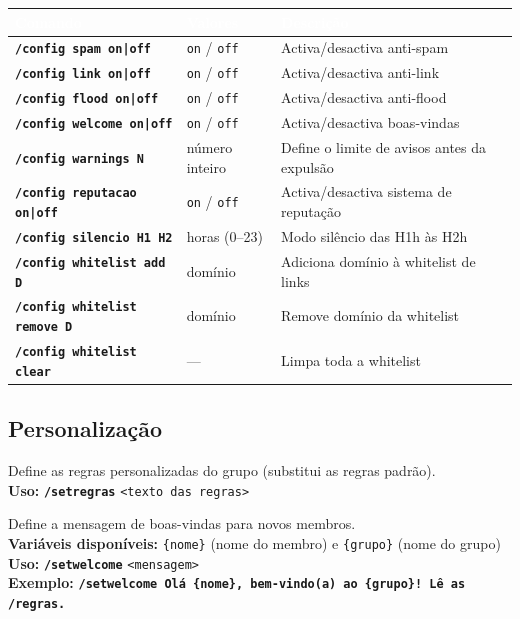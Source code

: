 \documentclass[12pt,a4paper]{article}
\newcommand{\cmd}[1]{\texttt{\textcolor{orbisblue}{\textbf{#1}}}}
\newcommand{\param}[1]{\texttt{\textcolor{orbisMid}{#1}}}
\begin{document}
\begin{center}
\begin{longtable}{L{4.5cm} L{4cm} L{5cm}}
\toprule
{}\textcolor{white}{\textbf{Comando}} & \textcolor{white}{\textbf{Valores}} & \textcolor{white}{\textbf{Descrição}} \\
\midrule
\endhead
\cmd{/config spam on|off} & \param{on} / \param{off} & Activa/desactiva anti-spam \\
\cmd{/config link on|off} & \param{on} / \param{off} & Activa/desactiva anti-link \\
\cmd{/config flood on|off} & \param{on} / \param{off} & Activa/desactiva anti-flood \\
\cmd{/config welcome on|off} & \param{on} / \param{off} & Activa/desactiva boas-vindas \\
\cmd{/config warnings N} & número inteiro & Define o limite de avisos antes da expulsão \\
\cmd{/config reputacao on|off} & \param{on} / \param{off} & Activa/desactiva sistema de reputação \\
\cmd{/config silencio H1 H2} & horas (0--23) & Modo silêncio das H1h às H2h \\
\cmd{/config whitelist add D} & domínio & Adiciona domínio à whitelist de links \\
\cmd{/config whitelist remove D} & domínio & Remove domínio da whitelist \\
\cmd{/config whitelist clear} & --- & Limpa toda a whitelist \\
\bottomrule
\end{longtable}
\end{center}

\subsection{Personalização}

\begin{tcolorbox}[cmdbox, title={\faEdit\ /setregras}]
Define as regras personalizadas do grupo (substitui as regras padrão).\\
\textbf{Uso:} \cmd{/setregras} \param{<texto das regras>}
\end{tcolorbox}

\begin{tcolorbox}[cmdbox, title={\faHandshake\ /setwelcome}]
Define a mensagem de boas-vindas para novos membros.\\
\textbf{Variáveis disponíveis:} \param{\{nome\}} (nome do membro) e \param{\{grupo\}} (nome do grupo)\\
\textbf{Uso:} \cmd{/setwelcome} \param{<mensagem>}\\
\textbf{Exemplo:} \cmd{/setwelcome Olá \{nome\}, bem-vindo(a) ao \{grupo\}! Lê as /regras.}
\end{tcolorbox}
\end{document}
